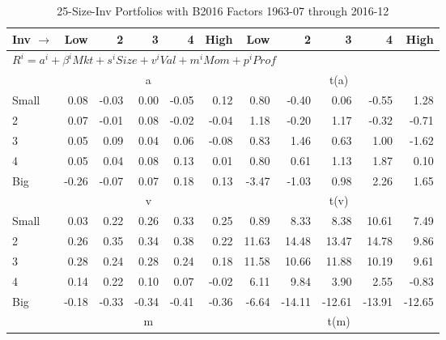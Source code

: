 
\begin{table}[!ht]
\centering
\caption{25-Size-Inv Portfolios with B2016 Factors 1963-07 through 2016-12}
\begin{tabular}{lrrrrrrrrrr}
  \toprule
    Inv $\rightarrow$ & Low & 2 & 3 & 4 & High & Low & 2 & 3 & 4 & High \\ 
  \midrule
  \multicolumn{11}{l}{$R^i=a^i+\beta^iMkt+s^iSize+v^iVal+m^iMom+p^iProf$} \\

  
    
      & \multicolumn{5}{c}{a} & \multicolumn{5}{c}{t(a)}
    
    \\
      \cmidrule(r){2-6} \cmidrule(r){7-11}

    Small   & 0.08  & -0.03  & 0.00  & -0.05  & 0.12  & 0.80  & -0.40  & 0.06  & -0.55  & 1.28  \\
         2  & 0.07  & -0.01  & 0.08  & -0.02  & -0.04  & 1.18  & -0.20  & 1.17  & -0.32  & -0.71  \\
         3  & 0.05  & 0.09  & 0.04  & 0.06  & -0.08  & 0.83  & 1.46  & 0.63  & 1.00  & -1.62  \\
         4  & 0.05  & 0.04  & 0.08  & 0.13  & 0.01  & 0.80  & 0.61  & 1.13  & 1.87  & 0.10  \\
    Big     & -0.26  & -0.07  & 0.07  & 0.18  & 0.13  & -3.47  & -1.03  & 0.98  & 2.26  & 1.65  \\

  
    
      & \multicolumn{5}{c}{v} & \multicolumn{5}{c}{t(v)}
    
    \\
      \cmidrule(r){2-6} \cmidrule(r){7-11}

    Small   & 0.03  & 0.22  & 0.26  & 0.33  & 0.25  & 0.89  & 8.33  & 8.38  & 10.61  & 7.49  \\
         2  & 0.26  & 0.35  & 0.34  & 0.38  & 0.22  & 11.63  & 14.48  & 13.47  & 14.78  & 9.86  \\
         3  & 0.28  & 0.24  & 0.28  & 0.24  & 0.18  & 11.58  & 10.66  & 11.88  & 10.19  & 9.61  \\
         4  & 0.14  & 0.22  & 0.10  & 0.07  & -0.02  & 6.11  & 9.84  & 3.90  & 2.55  & -0.83  \\
    Big     & -0.18  & -0.33  & -0.34  & -0.41  & -0.36  & -6.64  & -14.11  & -12.61  & -13.91  & -12.65  \\

  
    
      & \multicolumn{5}{c}{m} & \multicolumn{5}{c}{t(m)}
    

\end{tabular}
\end{table}
